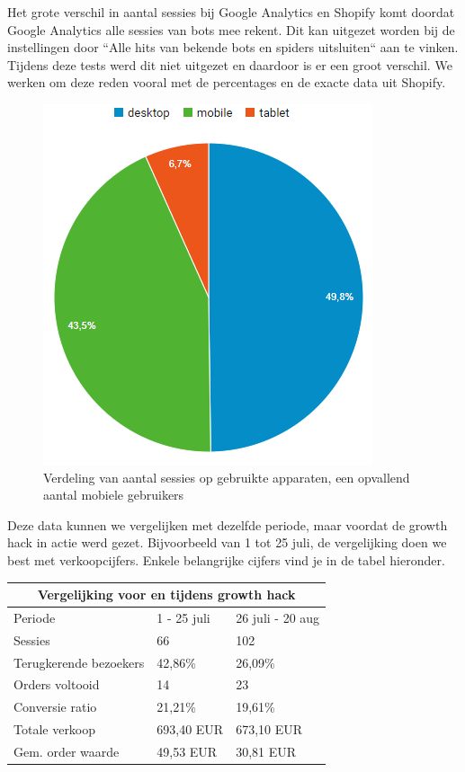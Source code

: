 Het grote verschil in aantal sessies bij Google Analytics en Shopify komt doordat Google Analytics alle sessies van bots mee rekent. Dit kan uitgezet worden bij de instellingen door ``Alle hits van bekende bots en spiders uitsluiten`` aan te vinken. Tijdens deze tests werd dit niet uitgezet en daardoor is er een groot verschil. We werken om deze reden vooral met de percentages en de exacte data uit Shopify.

\begin{figure}
	\includegraphics[scale=0.7]{img/sessies-per-apparaat.png}
	\centering
	\caption{Verdeling van aantal sessies op gebruikte apparaten, een opvallend aantal mobiele gebruikers}
	\label{fig:sessies-per-apparaat}
\end{figure}

Deze data kunnen we vergelijken met dezelfde periode, maar voordat de growth hack in actie werd gezet. Bijvoorbeeld van 1 tot 25 juli, de vergelijking doen we best met verkoopcijfers. Enkele belangrijke cijfers vind je in de tabel hieronder.


\begin{tabular}{ |p{4cm}||p{3cm}|p{3cm}|  }
	\hline
	\multicolumn{3}{|c|}{Vergelijking voor en tijdens growth hack} \\
	\hline
	Periode & 1 - 25 juli &26 juli - 20 aug\\
	\hline
	Sessies   & 66    &102\\
	Terugkerende bezoekers   & 42,86\%    &26,09\%\\
	Orders voltooid&   14  & 23\\
	Conversie ratio &21,21\% & 19,61\%\\
	Totale verkoop    &693,40 EUR & 673,10 EUR\\
	Gem. order waarde    &49,53  EUR& 30,81 EUR\\
	\hline
\end{tabular}

